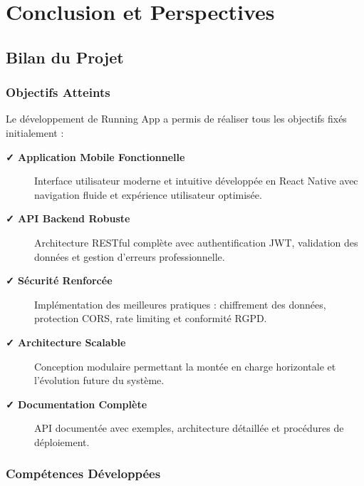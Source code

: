 \section{Conclusion et Perspectives}

\subsection{Bilan du Projet}

\subsubsection{Objectifs Atteints}

Le développement de Running App a permis de réaliser tous les objectifs fixés initialement :

\begin{description}
    \item[\textbf{✓ Application Mobile Fonctionnelle}] Interface utilisateur moderne et intuitive développée en React Native avec navigation fluide et expérience utilisateur optimisée.
    
    \item[\textbf{✓ API Backend Robuste}] Architecture RESTful complète avec authentification JWT, validation des données et gestion d'erreurs professionnelle.
    
    \item[\textbf{✓ Sécurité Renforcée}] Implémentation des meilleures pratiques : chiffrement des données, protection CORS, rate limiting et conformité RGPD.
    
    \item[\textbf{✓ Architecture Scalable}] Conception modulaire permettant la montée en charge horizontale et l'évolution future du système.
    
    \item[\textbf{✓ Documentation Complète}] API documentée avec exemples, architecture détaillée et procédures de déploiement.
\end{description}

\subsubsection{Compétences Développées}

